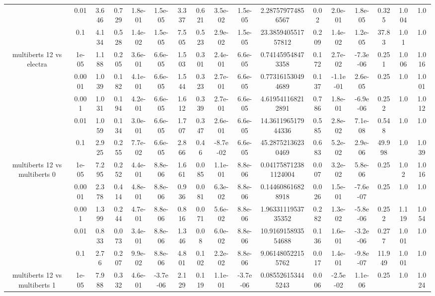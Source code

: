 \begin{tabular}{|c|c|c|c|c|c|c|c|c|c|c|c|c|c|c|c|c|}
 & 0.01 & 3.646 & 0.729 & 1.8e-01 & 1.5e-05 & 3.337 & 0.621 & 3.5e-02 & 1.5e-05 & 2.287579774856567 & 0.02 & 2.0e-01 & 1.8e-05 & 0.325 & 1.004 & 1.0 \\
 & 0.1 & 4.134 & 0.528 & 1.4e-02 & 1.5e-05 & 7.505 & 0.523 & 2.9e-02 & 1.5e-05 & 23.385940551757812 & 0.209 & 1.4e-02 & 1.2e-05 & 37.83 & 1.01 & 1.0 \\
\hline
\multirow{5}{*}{multiberts 12 vs electra } & 1e-05 & 1.188 & 0.205 & 3.6e-01 & 6.6e-05 & 1.503 & 0.301 & 2.4e-01 & 6.6e-05 & 0.741459548473358 & 0.172 & 2.7e-02 & -7.3e-06 & 0.251 & 1.006 & 1.016 \\
 & 0.0001 & 1.039 & 0.182 & 4.1e-01 & 6.6e-05 & 1.544 & 0.323 & 2.7e-01 & 6.6e-05 & 0.773161530494689 & 0.137 & -1.1e-01 & 2.6e-05 & 0.25 & 1.0 & 1.001 \\
 & 0.001 & 1.031 & 0.194 & 4.2e-01 & 6.6e-05 & 1.612 & 0.339 & 2.7e-01 & 6.6e-05 & 4.619541168212891 & 0.786 & 1.8e-01 & -6.9e-06 & 0.252 & 1.0 & 1.012 \\
 & 0.01 & 1.059 & 0.134 & 3.0e-01 & 6.6e-05 & 1.707 & 0.347 & 2.6e-01 & 6.6e-05 & 14.361196517944336 & 0.585 & 2.8e-02 & 7.1e-08 & 0.548 & 1.0 & 1.0 \\
 & 0.1 & 2.925 & 0.255 & 7.7e-02 & 6.6e-05 & 2.866 & 0.46 & -8.7e-02 & 6.6e-05 & 45.28752136230469 & 0.683 & 5.2e-02 & 2.9e-06 & 49.998 & 1.0 & 1.039 \\
\hline
\multirow{5}{*}{multiberts 12 vs multiberts 0} & 1e-05 & 7.295 & 0.252 & 4.4e-01 & 8.8e-06 & 1.661 & 0.085 & 1.1e-01 & 8.8e-06 & 0.041758712381124004 & 0.007 & 3.2e-02 & 5.8e-06 & 0.25 & 1.02 & 1.016 \\
 & 0.0001 & 2.378 & 0.414 & 4.8e-01 & 8.8e-06 & 0.936 & 0.081 & 6.3e-02 & 8.8e-06 & 0.144608616828918 & 0.026 & 1.5e-01 & -7.6e-07 & 0.25 & 1.0 & 1.0 \\
 & 0.001 & 1.399 & 0.244 & 4.7e-01 & 8.8e-06 & 0.816 & 0.071 & 5.6e-02 & 8.8e-06 & 1.9633111953735352 & 0.282 & 1.3e-02 & -5.8e-06 & 0.252 & 1.119 & 1.054 \\
 & 0.01 & 0.833 & 0.073 & 3.4e-01 & 8.8e-06 & 1.346 & 0.08 & 6.0e-02 & 8.8e-06 & 10.916915893554688 & 0.136 & 1.6e-01 & -3.2e-06 & 0.277 & 1.001 & 1.0 \\
 & 0.1 & 2.76 & 0.207 & 9.9e-02 & 8.8e-06 & 4.801 & 0.102 & 2.2e-02 & 8.8e-06 & 9.061480522155762 & 0.017 & 1.4e-01 & -9.8e-07 & 11.949 & 1.001 & 1.0 \\
\hline
\multirow{5}{*}{multiberts 12 vs multiberts 1} & 1e-05 & 7.988 & 0.332 & 4.6e-01 & -3.7e-06 & 2.129 & 0.119 & 1.1e-01 & -3.7e-06 & 0.085526153445243 & 0.006 & -2.5e-02 & 1.1e-06 & 0.25 & 1.0 & 1.024 \\

\end{tabular}

